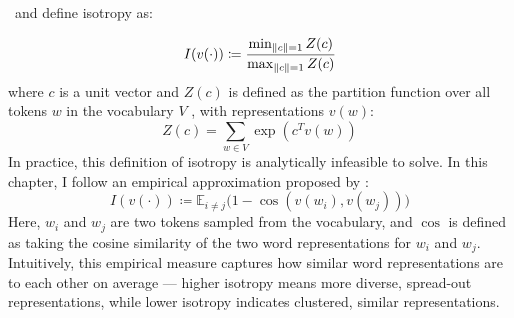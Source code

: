 \citet{arora2016latent}\ and \citet{mu2018all} define isotropy as:

\begin{equation}
    I(v(\cdot)) \coloneq \frac{\min_{\left\lVert c\right\rVert=1} Z(c)}{\max_{\left\lVert c\right\rVert=1} Z(c)}
\end{equation}
where $c$ is a unit vector and $Z(c)$ is defined as the partition function over all tokens $w$ in the vocabulary $V$ , with representations $v(w)$:
$$
    Z(c) = \sum_{w \in V} \exp(c^Tv(w))
$$
In practice, this definition of isotropy is analytically infeasible to solve. In this chapter, I follow an empirical approximation proposed by \citet{ethayarajh2019contextual}: 
\begin{equation}
\label{eq:empirical-isotropy}
    I(v(\cdot)) \coloneq \mathbb{E}_{i\ne j}\big(1-\cos(v(w_i), v(w_j))\big)
\end{equation}
Here, $w_i$ and $w_j$ are two tokens sampled from the vocabulary, and $\cos$ is defined as taking the cosine similarity of the two word representations for $w_i$ and $w_j$. Intuitively, this empirical measure captures how similar word representations are to each other on average --- higher isotropy means more diverse, spread-out representations, while lower isotropy indicates clustered, similar representations.

\vspace{1em}



